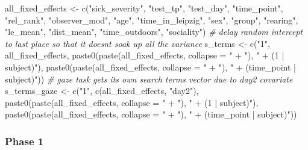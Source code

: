 \documentclass[
]{article}
\newenvironment{Shaded}{\begin{snugshade}}{\end{snugshade}}
\newcommand{\AttributeTok}[1]{\textcolor[rgb]{0.77,0.63,0.00}{#1}}
\newcommand{\CommentTok}[1]{\textcolor[rgb]{0.56,0.35,0.01}{\textit{#1}}}
\newcommand{\FunctionTok}[1]{\textcolor[rgb]{0.00,0.00,0.00}{#1}}
\newcommand{\NormalTok}[1]{#1}
\newcommand{\OtherTok}[1]{\textcolor[rgb]{0.56,0.35,0.01}{#1}}
\newcommand{\StringTok}[1]{\textcolor[rgb]{0.31,0.60,0.02}{#1}}
\begin{document}
\begin{Shaded}
\begin{Highlighting}[]
\NormalTok{all\_fixed\_effects }\OtherTok{\textless{}{-}} \FunctionTok{c}\NormalTok{(}\StringTok{"sick\_severity"}\NormalTok{,}
                       \StringTok{"test\_tp"}\NormalTok{, }\StringTok{"test\_day"}\NormalTok{, }\StringTok{"time\_point"}\NormalTok{,}
                       \StringTok{"rel\_rank"}\NormalTok{,}
                       \StringTok{"observer\_mod"}\NormalTok{,}
                       \StringTok{"age"}\NormalTok{, }\StringTok{"time\_in\_leipzig"}\NormalTok{,}
                       \StringTok{"sex"}\NormalTok{, }\StringTok{"group"}\NormalTok{,}
                       \StringTok{"rearing"}\NormalTok{,}
                       \StringTok{"le\_mean"}\NormalTok{, }\StringTok{"dist\_mean"}\NormalTok{,}
                       \StringTok{"time\_outdoors"}\NormalTok{,}
                       \StringTok{"sociality"}\NormalTok{)}
\CommentTok{\# delay random intercept to last place so that it doesn\textquotesingle{}t soak up all the variance}
\NormalTok{s\_terms }\OtherTok{\textless{}{-}} \FunctionTok{c}\NormalTok{(}\StringTok{"1"}\NormalTok{, all\_fixed\_effects, }
             \FunctionTok{paste0}\NormalTok{(}\FunctionTok{paste}\NormalTok{(all\_fixed\_effects, }\AttributeTok{collapse =} \StringTok{" + "}\NormalTok{), }
                    \StringTok{" + (1 | subject)"}\NormalTok{),}
             \FunctionTok{paste0}\NormalTok{(}\FunctionTok{paste}\NormalTok{(all\_fixed\_effects, }\AttributeTok{collapse =} \StringTok{" + "}\NormalTok{), }
                    \StringTok{" + (time\_point | subject)"}\NormalTok{)) }
\CommentTok{\# gaze task gets its own search terms vector due to \textasciigrave{}day2\textasciigrave{} covariate}
\NormalTok{s\_terms\_gaze }\OtherTok{\textless{}{-}} \FunctionTok{c}\NormalTok{(}\StringTok{"1"}\NormalTok{, }\FunctionTok{c}\NormalTok{(all\_fixed\_effects, }\StringTok{"day2"}\NormalTok{), }
                  \FunctionTok{paste0}\NormalTok{(}\FunctionTok{paste}\NormalTok{(all\_fixed\_effects, }\AttributeTok{collapse =} \StringTok{" + "}\NormalTok{), }
                    \StringTok{" + (1 | subject)"}\NormalTok{),}
                  \FunctionTok{paste0}\NormalTok{(}\FunctionTok{paste}\NormalTok{(all\_fixed\_effects, }\AttributeTok{collapse =} \StringTok{" + "}\NormalTok{), }
                    \StringTok{" + (time\_point | subject)"}\NormalTok{))}
\end{Highlighting}
\end{Shaded}

\hypertarget{phase-1}{%
\subsubsection{Phase 1}\label{phase-1}}
\end{document}
